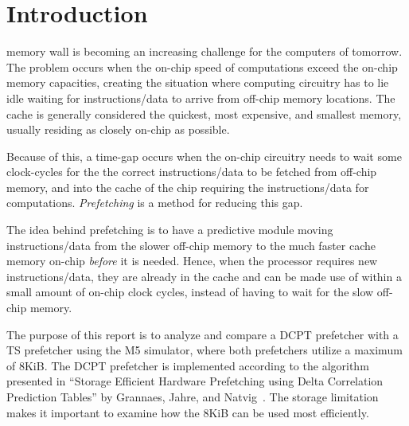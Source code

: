 \section{Introduction}

 memory wall is becoming an increasing challenge for the
computers of tomorrow. The problem occurs when the on-chip speed of computations
exceed the on-chip memory capacities, creating the situation where computing
circuitry has to lie idle waiting for instructions/data to arrive from off-chip
memory locations. The cache is generally considered the quickest, most
expensive, and smallest memory, usually residing as closely on-chip as possible.

Because of this, a time-gap occurs when the on-chip circuitry needs to wait some
clock-cycles for the the correct instructions/data to be fetched from off-chip
memory, and into the cache of the chip requiring the instructions/data for
computations. \emph{Prefetching} is a method for reducing this gap.

The idea behind prefetching is to have a predictive module moving
instructions/data from the slower off-chip memory to the much faster cache
memory on-chip \emph{before} it is needed. Hence, when the processor requires
new instructions/data, they are already in the cache and can be made use of
within a small amount of on-chip clock cycles, instead of having to wait for the
slow off-chip memory.

The purpose of this report is to analyze and compare a DCPT prefetcher with a
TS prefetcher using the M5 simulator, where both prefetchers
utilize a maximum of 8KiB. The DCPT prefetcher is implemented according to the
algorithm presented in ``Storage Efficient Hardware Prefetching using Delta
Correlation Prediction Tables'' by Grannaes, Jahre, and Natvig~\cite{dcpt}. The
storage limitation makes it important to examine how the 8KiB can be used most
efficiently.


